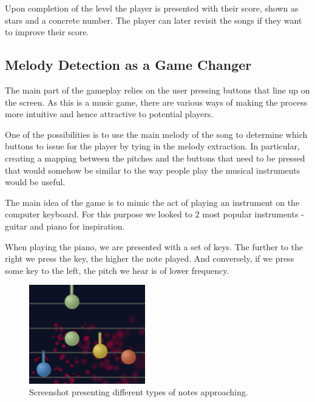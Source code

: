 Upon completion of the level the player is presented with their score, shown as stars and a concrete number. The player can later revisit the songs if they want to improve their score. 

\vspace{10pt}

\subsection{Melody Detection as a Game Changer}

The main part of the gameplay relies on the user pressing buttons that line up on the screen. As this is a music game, there are various ways of making the process more intuitive and hence attractive to potential players. 

One of the possibilities is to use the main melody of the song to determine which buttons to issue for the player by tying in the melody extraction. In particular, creating a mapping between the pitches and the buttons that need to be pressed that would somehow be similar to the way people play the musical instruments would be useful.

The main idea of the game is to mimic the act of playing an instrument on the computer keyboard. For this purpose we looked to 2 most popular instruments - guitar and piano for inspiration. 


When playing the piano, we are presented with a set of keys. The further to the right we press the key, the higher the note played. And conversely, if we press some key to the left, the pitch we hear is of lower frequency. 

\begin{figure}
  \begin{center}
    \includegraphics[width=0.45\textwidth]{Figures/NotesComing}
  \end{center}
  \caption{Screenshot presenting different types of notes approaching.}
\label{fig:notetypes}
\end{figure}

